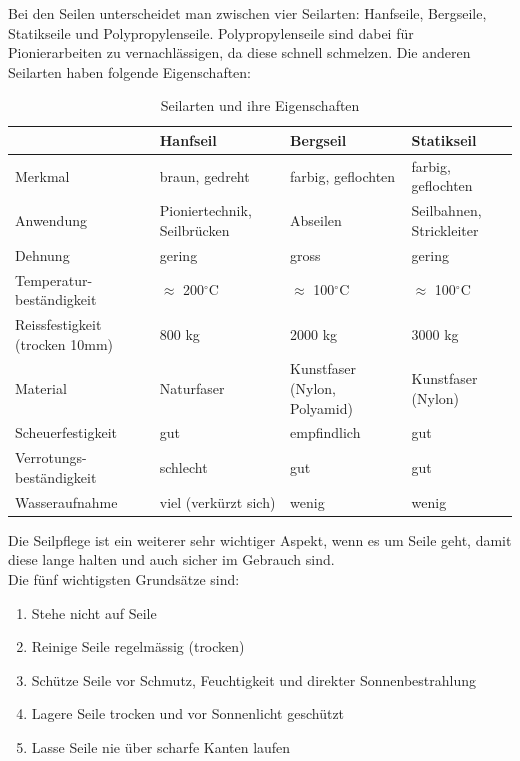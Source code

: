 Bei den Seilen unterscheidet man zwischen vier Seilarten: Hanfseile, Bergseile, Statikseile und Polypropylenseile. Polypropylenseile sind dabei für Pionierarbeiten zu vernachlässigen, da diese schnell schmelzen. Die anderen Seilarten haben folgende Eigenschaften:
\begin{center}
\begin{table}
\begin{tabularx}{\textwidth}{p{}|X|X|X}
     & \textbf{Hanfseil} & \textbf{Bergseil} & \textbf{Statikseil} \\ \hline
     Merkmal & braun, gedreht & farbig, geflochten & farbig, geflochten \\\hline
     Anwendung & Pioniertechnik, Seilbrücken & Abseilen & Seilbahnen, Strickleiter \\\hline
     Dehnung & gering & gross & gering \\\hline
     Temperatur- beständigkeit & $\approx$ 200$^\circ$C & $\approx$ 100$^\circ$C & $\approx$ 100$^\circ$C \\\hline
     Reissfestigkeit (trocken 10mm) & 800 kg & 2000 kg & 3000 kg \\\hline
     Material & Naturfaser & Kunstfaser (Nylon, Polyamid) & Kunstfaser (Nylon) \\\hline
     Scheuerfestigkeit & gut & empfindlich & gut \\\hline
     Verrotungs- beständigkeit & schlecht & gut & gut \\\hline
     Wasseraufnahme & viel (verkürzt sich) & wenig & wenig \\
\end{tabularx}
\caption{Seilarten und ihre Eigenschaften}
\end{table}
\end{center}
Die Seilpflege ist ein weiterer sehr wichtiger Aspekt, wenn es um Seile geht, damit diese lange halten und auch sicher im Gebrauch sind. \\Die fünf wichtigsten Grundsätze sind:
\begin{enumerate}
\item Stehe nicht auf Seile
\item Reinige Seile regelmässig (trocken)
\item Schütze Seile vor Schmutz, Feuchtigkeit und direkter Sonnenbestrahlung
\item Lagere Seile trocken und vor Sonnenlicht geschützt
\item Lasse Seile nie über scharfe Kanten laufen
\end{enumerate}

